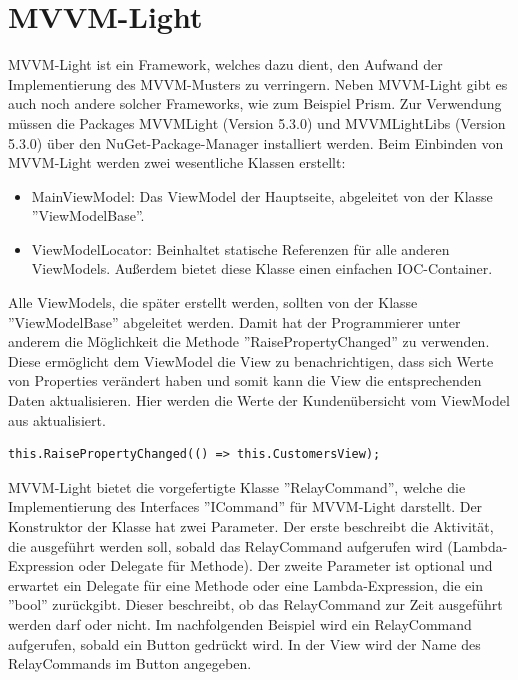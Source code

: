 \section{MVVM-Light}
MVVM-Light ist ein Framework, welches dazu dient, den Aufwand der Implementierung des MVVM-Musters zu verringern. Neben MVVM-Light gibt es auch noch andere solcher Frameworks, wie zum Beispiel Prism. \newline Zur Verwendung müssen die Packages MVVMLight (Version 5.3.0) und MVVMLightLibs (Version 5.3.0) über den NuGet-Package-Manager installiert werden. \newline Beim Einbinden von MVVM-Light werden zwei wesentliche Klassen erstellt:
\begin{itemize}
\item MainViewModel: Das ViewModel der Hauptseite, abgeleitet von der Klasse ''ViewModelBase''.
\item ViewModelLocator: Beinhaltet statische Referenzen für alle anderen ViewModels. Außerdem bietet diese Klasse einen einfachen IOC-Container.
\end{itemize}
Alle ViewModels, die später erstellt werden, sollten von der Klasse ''ViewModelBase'' abgeleitet werden. Damit hat der Programmierer unter anderem die Möglichkeit die Methode ''RaisePropertyChanged'' zu verwenden. Diese ermöglicht dem ViewModel die View zu benachrichtigen, dass sich Werte von Properties verändert haben und somit kann die View die entsprechenden Daten aktualisieren. \newline
Hier werden die Werte der Kundenübersicht vom ViewModel aus aktualisiert.
\begin{lstlisting}
this.RaisePropertyChanged(() => this.CustomersView);
\end{lstlisting}
MVVM-Light bietet die vorgefertigte Klasse ''RelayCommand'', welche die Implementierung des Interfaces ''ICommand'' für MVVM-Light darstellt. Der Konstruktor der Klasse hat zwei Parameter. Der erste beschreibt die Aktivität, die ausgeführt werden soll, sobald das RelayCommand aufgerufen wird (Lambda-Expression oder Delegate für Methode). Der zweite Parameter ist optional und erwartet ein Delegate für eine Methode oder eine Lambda-Expression, die ein ''bool'' zurückgibt. Dieser  beschreibt, ob das RelayCommand zur Zeit ausgeführt werden darf oder nicht.
\newline 
Im nachfolgenden Beispiel wird ein RelayCommand aufgerufen, sobald ein Button gedrückt wird.
\newline In der View wird der Name des RelayCommands im Button angegeben.
